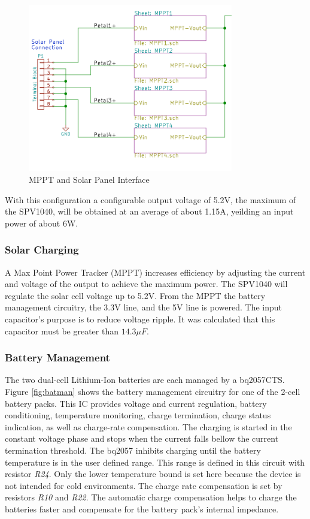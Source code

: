 \documentclass{article}
\numberwithin{figure}{section}
\numberwithin{equation}{section}
\begin{document}
{\begin{figure}[H]
	\centering
	\includegraphics[width=0.8\textwidth]{MPPTblocks}
	\caption{MPPT and Solar Panel Interface}
	\label{fig:mpptsol}
\end{figure}

With this configuration a configurable output voltage of 5.2V, the maximum of the SPV1040, will be obtained at an average of about 1.15A, yeilding an input power of about 6W.

\subsubsection{Solar Charging}

A Max Point Power Tracker (MPPT) increases efficiency by adjusting the current and voltage of the output to achieve the maximum power. The SPV1040 will regulate the solar cell voltage up to 5.2V. From the MPPT the battery management circuitry, the 3.3V line, and the 5V line is powered. The input capacitor's purpose is to reduce voltage ripple. It was calculated that this capacitor must be greater than $14.3\mu F$.

\subsubsection{Battery Management}

The two dual-cell Lithium-Ion batteries are each managed by a bq2057CTS. Figure \ref{fig:batman} shows the battery management circuitry for one of the 2-cell battery packs. This IC provides voltage and current regulation, battery conditioning, temperature monitoring, charge termination, charge status indication, as well as charge-rate compensation. The charging is started in the constant voltage phase and stops when the current falls bellow the current termination threshold. The bq2057 inhibits charging until the battery temperature is in the user defined range. This range is defined in this circuit with resistor \textit{R24}. Only the lower temperature bound is set here because the device is not intended for cold environments. The charge rate compensation is set by resistors \textit{R10} and \textit{R22}. The automatic charge compensation helps to charge the batteries faster and compensate for the battery pack's internal impedance.

}
\end{document}
